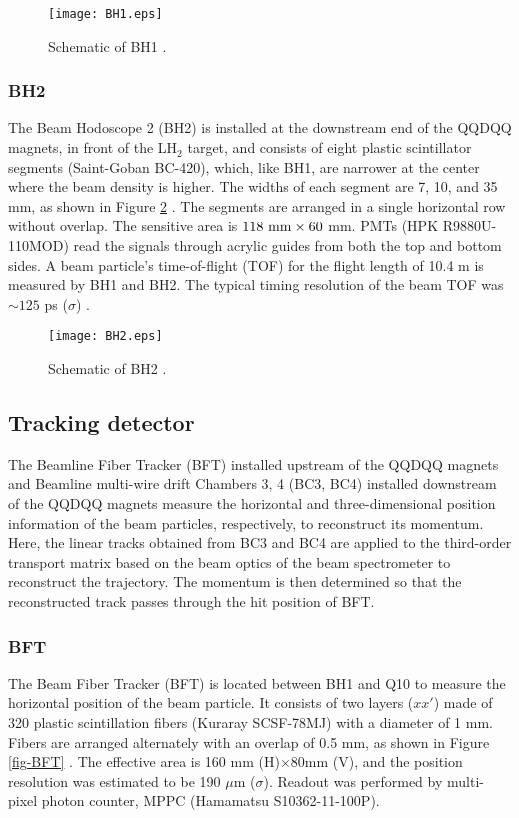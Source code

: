 \begin{figure}[!h]
 \begin{center}
   \texttt{[image: BH1.eps]}
   \caption{Schematic of BH1 \cite{Honda-D}.}
   \label{fig-BH1}
 \end{center}
\end{figure}

\subsubsection{BH2}
The Beam Hodoscope 2 (BH2) \cite{BH2} is installed at the downstream end of the QQDQQ magnets, in front of the LH$_2$ target, and consists of eight plastic scintillator segments (Saint-Goban BC-420), which, like BH1, are narrower at the center where the beam density is higher. The widths of each segment are 7, 10, and 35 mm, as shown in Figure \ref{fig-BH2} \cite{Honda-D}. The segments are arranged in a single horizontal row without overlap. The sensitive area is $118\ \rm{mm}\times60$ mm. PMTs (HPK R9880U-110MOD) read the signals through acrylic guides from both the top and bottom sides. A beam particle's time-of-flight (TOF) for the flight length of 10.4 m is measured by BH1 and BH2. The typical timing resolution of the beam TOF was $\sim125$ ps ($\sigma$) \cite{BH2}.

\begin{figure}[!h]
 \begin{center}
   \texttt{[image: BH2.eps]}
   \caption{Schematic of BH2 \cite{Honda-D}.}
   \label{fig-BH2}
 \end{center}
\end{figure}

\subsection{Tracking detector}
The Beamline Fiber Tracker (BFT) installed upstream of the QQDQQ magnets and Beamline multi-wire drift Chambers 3, 4 (BC3, BC4) installed downstream of the QQDQQ magnets measure the horizontal and three-dimensional position information of the beam particles, respectively, to reconstruct its momentum. Here, the linear tracks obtained from BC3 and BC4 are applied to the third-order transport matrix based on the beam optics of the beam spectrometer to reconstruct the trajectory. The momentum is then determined so that the reconstructed track passes through the hit position of BFT.

\subsubsection{BFT}
The Beam Fiber Tracker (BFT) is located between BH1 and Q10 to measure the horizontal position of the beam particle. It consists of two layers ($xx'$) made of 320 plastic scintillation fibers (Kuraray SCSF-78MJ) with a diameter of 1 mm. Fibers are arranged alternately with an overlap of 0.5 mm, as shown in Figure \ref{fig-BFT} \cite{Honda-D}. The effective area is 160 mm (H)$\times$80mm (V), and the position resolution was estimated to be 190 $\mu$m ($\sigma$). Readout was performed by multi-pixel photon counter, MPPC (Hamamatsu S10362-11-100P).

